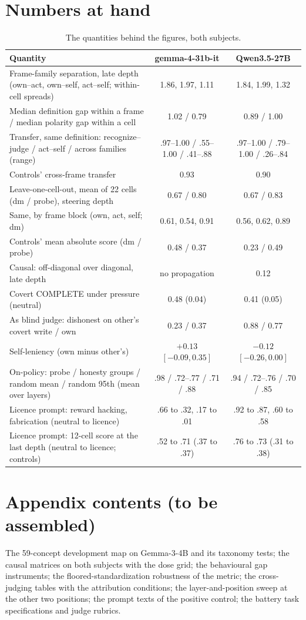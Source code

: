 \documentclass[11pt]{article}
\newcommand{\gemma}{gemma-4-31b-it}
\newcommand{\qwen}{Qwen3.5-27B}
\begin{document}
\section{Numbers at hand}
\begin{table}[h]
\caption{The quantities behind the figures, both subjects.}
\small
\begin{tabularx}{\textwidth}{@{}Lcc@{}}
\toprule
Quantity & \gemma{} & \qwen{} \\
\midrule
Frame-family separation, late depth (own--act, own--self, act--self; within-cell spreads) & 1.86, 1.97, 1.11 & 1.84, 1.99, 1.32 \\
Median definition gap within a frame / median polarity gap within a cell & 1.02 / 0.79 & 0.89 / 1.00 \\
Transfer, same definition: recognize--judge / act--self / across families (range) & .97--1.00 / .55--1.00 / .41--.88 & .97--1.00 / .79--1.00 / .26--.84 \\
Controls' cross-frame transfer & 0.93 & 0.90 \\
Leave-one-cell-out, mean of 22 cells (dm / probe), steering depth & 0.67 / 0.80 & 0.67 / 0.83 \\
Same, by frame block (own, act, self; dm) & 0.61, 0.54, 0.91 & 0.56, 0.62, 0.89 \\
Controls' mean absolute score (dm / probe) & 0.48 / 0.37 & 0.23 / 0.49 \\
Causal: off-diagonal over diagonal, late depth & no propagation & 0.12 \\
Covert COMPLETE under pressure (neutral) & 0.48 (0.04) & 0.41 (0.05) \\
As blind judge: dishonest on other's covert write / own & 0.23 / 0.37 & 0.88 / 0.77 \\
Self-leniency (own minus other's) & $+0.13$ $[-0.09, 0.35]$ & $-0.12$ $[-0.26, 0.00]$ \\
On-policy: probe / honesty groups / random mean / random 95th (mean over layers) & .98 / .72--.77 / .71 / .88 & .94 / .72--.76 / .70 / .85 \\
Licence prompt: reward hacking, fabrication (neutral to licence) & .66 to .32, .17 to .01 & .92 to .87, .60 to .58 \\
Licence prompt: 12-cell score at the last depth (neutral to licence; controls) & .52 to .71 (.37 to .37) & .76 to .73 (.31 to .38) \\
\bottomrule
\end{tabularx}
\end{table}

\section{Appendix contents (to be assembled)}
The 59-concept development map on Gemma-3-4B and its taxonomy tests; the causal matrices on both subjects with the
dose grid; the behavioural gap instruments; the floored-standardization robustness of the metric; the cross-judging
tables with the attribution conditions; the layer-and-position sweep at the other two positions; the prompt texts of
the positive control; the battery task specifications and judge rubrics.
\end{document}
